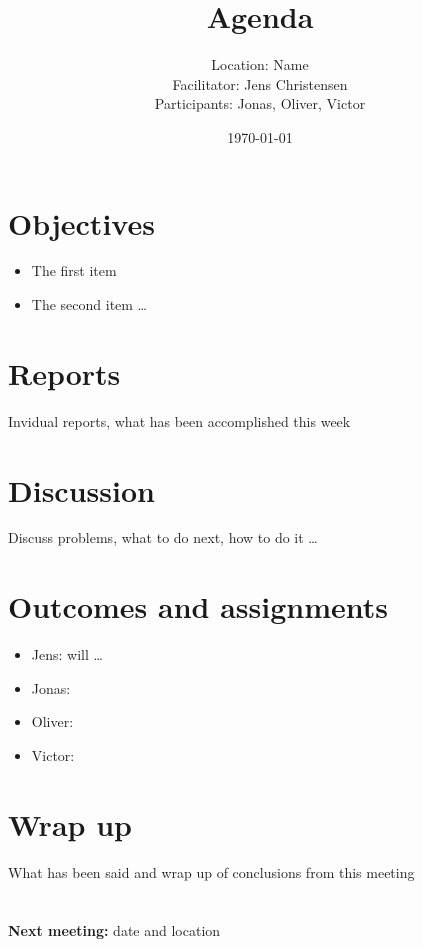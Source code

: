\documentclass[11pt]{article}
\title{Agenda}
\author{Location: Name \\
  Facilitator: Jens Christensen \\
  Participants: Jonas, Oliver, Victor}
\date{\today}
\begin{document}
\maketitle

\section{Objectives}
\begin{itemize}
 
  \item The first item
  \item The second item \ldots
 
\end{itemize}

\section{Reports}

Invidual reports, what has been accomplished this week

\section{Discussion}

Discuss problems, what to do next, how to do it \ldots

\section{Outcomes and assignments}

\begin{itemize}
 
  \item Jens: will \ldots
  \item Jonas:  
  \item Oliver:  
  \item Victor:  

\end{itemize}

\section{Wrap up}

What has been said and wrap up of conclusions from this meeting
\\\\\\
\textbf{Next meeting:} date and location
\end{document}
